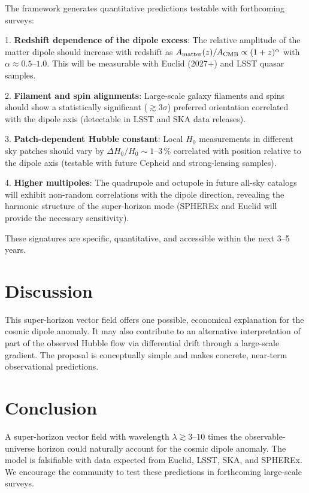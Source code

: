 \documentclass[11pt,a4paper]{article}
\begin{document}
The framework generates quantitative predictions testable with forthcoming surveys:

1. \textbf{Redshift dependence of the dipole excess}: The relative amplitude of the matter dipole should increase with redshift as $A_{\rm matter}(z) / A_{\rm CMB} \propto (1+z)^\alpha$ with $\alpha \approx 0.5$--$1.0$. This will be measurable with Euclid (2027+) and LSST quasar samples.

2. \textbf{Filament and spin alignments}: Large-scale galaxy filaments and spins should show a statistically significant ($\gtrsim 3\sigma$) preferred orientation correlated with the dipole axis (detectable in LSST and SKA data releases).

3. \textbf{Patch-dependent Hubble constant}: Local $H_0$ measurements in different sky patches should vary by $\Delta H_0 / H_0 \sim 1$--$3\,\%$ correlated with position relative to the dipole axis (testable with future Cepheid and strong-lensing samples).

4. \textbf{Higher multipoles}: The quadrupole and octupole in future all-sky catalogs will exhibit non-random correlations with the dipole direction, revealing the harmonic structure of the super-horizon mode (SPHEREx and Euclid will provide the necessary sensitivity).

These signatures are specific, quantitative, and accessible within the next 3--5 years.

\section{Discussion}

This super-horizon vector field offers one possible, economical explanation for the cosmic dipole anomaly. It may also contribute to an alternative interpretation of part of the observed Hubble flow via differential drift through a large-scale gradient. The proposal is conceptually simple and makes concrete, near-term observational predictions.

\section{Conclusion}

A super-horizon vector field with wavelength $\lambda \gtrsim 3$--$10$ times the observable-universe horizon could naturally account for the cosmic dipole anomaly. The model is falsifiable with data expected from Euclid, LSST, SKA, and SPHEREx. We encourage the community to test these predictions in forthcoming large-scale surveys.
\end{document}
